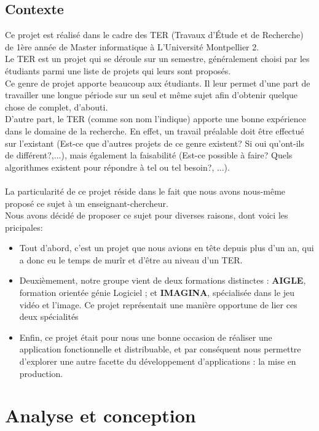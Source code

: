 \documentclass{report}
\begin{document}
		\section{Contexte}
		Ce projet est réalisé dans le cadre des TER (Travaux d'Étude et de Recherche) de 1ère année de Master informatique à L'Université Montpellier 2. \\
		Le TER est un projet qui se déroule sur un semestre, généralement choisi par les étudiants parmi une liste de projets qui leurs sont proposés. \\Ce genre de projet apporte beaucoup aux étudiants. Il leur permet d'une part de travailler une longue période sur un seul et même sujet afin d'obtenir quelque chose de complet, d'abouti. \\D'autre part, le TER (comme son nom l'indique) apporte une bonne expérience dans le domaine de la recherche. En effet, un travail préalable doit être effectué sur l'existant (Est-ce que d'autres projets de ce genre existent? Si oui qu'ont-ils de différent?,...), mais également la faisabilité (Est-ce possible à faire? Quels algorithmes existent pour répondre à tel ou tel besoin?, ...). \\
		$$$$ \\
		La particularité de ce projet réside dans le fait que nous avons nous-même proposé ce sujet à un enseignant-chercheur.\\
		Nous avons décidé de proposer ce sujet pour diverses raisons, dont voici les pricipales:
		\begin{itemize}
			\item Tout d'abord, c'est un projet que nous avions en tête depuis plus d'un an, qui a donc eu le temps de murîr et d'être au niveau d'un TER.
			\item Deuxièmement, notre groupe vient de deux formations distinctes : \textbf{AIGLE}, formation orientée génie Logiciel ; et \textbf{IMAGINA}, spécialisée dans le jeu vidéo et l'image. Ce projet représentait une manière opportune de lier ces deux spécialités
			\item Enfin, ce projet était pour nous une bonne occasion de réaliser une application fonctionnelle et distribuable, et par conséquent nous permettre d'explorer une autre facette du développement d'applications : la mise en production.

		\end{itemize}	
	\chapter{Analyse et conception}
\end{document}
